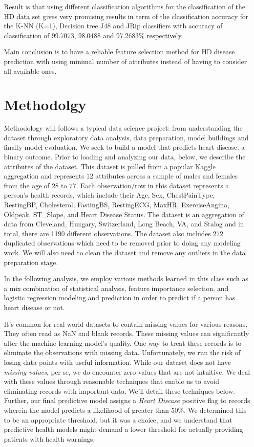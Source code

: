 \documentclass[
]{article}
\begin{document}
Result is that using different classification algorithms for the
classification of the HD data set gives very promising results in term
of the classification accuracy for the K-NN (K=1), Decision tree J48 and
JRip classifiers with accuracy of classification of 99.7073, 98.0488 and
97.2683\% respectively.

Main conclusion is to have a reliable feature selection method for HD
disease prediction with using minimal number of attributes instead of
having to consider all available ones.

\section{Methodolgy}\label{methodolgy}

Methodology will follows a typical data science project: from
understanding the dataset through exploratory data analysis, data
preparation, model buildings and finally model evaluation. We seek to
build a model that predicts heart disease, a binary outcome. Prior to
loading and analyzing our data, below, we describe the attributes of the
dataset. This dataset is pulled from a popular Kaggle aggregation and
represents 12 attributes across a sample of males and females from the
age of 28 to 77. Each observation/row in this dataset represents a
person's health records, which include their Age, Sex, ChestPainType,
RestingBP, Cholesterol, FastingBS, RestingECG, MaxHR, ExerciseAngina,
Oldpeak, ST\_Slope, and Heart Disease Status. The dataset is an
aggregation of data from Cleveland, Hungary, Switzerland, Long Beach,
VA, and Stalog and in total, there are 1190 different observations. The
dataset also includes 272 duplicated observations which need to be
removed prior to doing any modeling work. We will also need to clean the
dataset and remove any outliers in the data preparation stage.

In the following analysis, we employ various methods learned in this
class such as a mix combination of statistical analysis, feature
importance selection, and logistic regression modeling and prediction in
order to predict if a person has heart disease or not.

It's common for real-world datasets to contain missing values for
various reasons. They often read as NaN and blank records. These missing
values can significantly alter the machine learning model's quality. One
way to treat these records is to eliminate the observations with missing
data. Unfortunately, we run the risk of losing data points with useful
information. While our dataset does not have \emph{missing values}, per
se, we do encounter zero values that are not intuitive. We deal with
these values through reasonable techniques that enable us to avoid
eliminating records with important data. We'll detail these techniques
below. Further, our final predictive model assigns a \emph{Heart
Disease} positive flag to records wherein the model predicts a
likelihood of greater than 50\%. We determined this to be an appropriate
threshold, but it was a choice, and we understand that predictive health
models might demand a lower threshold for actually providing patients
with health warnings.
\end{document}
